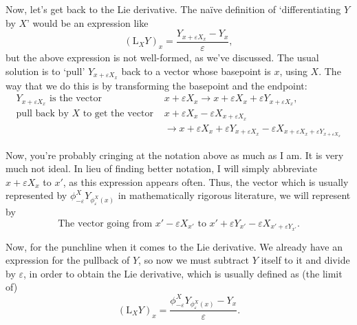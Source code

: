 \documentclass{article}
\theoremstyle{definition}
\newcommand{\Lie}{\mathrm{L}}
\begin{document}
Now, let's get back to the Lie derivative. The naïve definition of `differentiating $Y$ by $X$' would be an expression like
\begin{equation}
(\Lie_X Y)_x = \frac{Y_{x + \varepsilon X_x} - Y_x}\varepsilon,
\end{equation}
but the above expression is not well-formed, as we've discussed. The usual solution is to `pull' $Y_{x + \varepsilon X_x}$ back to a vector whose basepoint is $x$, using $X$. The way that we do this is by transforming the basepoint and the endpoint:
\begin{equation}
\begin{aligned}
Y_{x + \varepsilon X_x} \text{ is the vector }& x + \varepsilon X_x \rightarrow x + \varepsilon X_x + \varepsilon Y_{x + \varepsilon X_x},\\
\text{pull back by $X$ to get the vector }& x + \varepsilon X_x - \varepsilon X_{x+\varepsilon X_x}\\
& \rightarrow x + \varepsilon X_x + \varepsilon Y_{x + \varepsilon X_x} - \varepsilon X_{x + \varepsilon X_x + \varepsilon Y_{x + \varepsilon X_x}}
\end{aligned}
\end{equation}

Now, you're probably cringing at the notation above as much as I am. It is very much not ideal. In lieu of finding better notation, I will simply abbreviate $x + \varepsilon X_x$ to $x'$, as this expression appears often. Thus, the vector which is usually represented by $\phi^X_{-\varepsilon} Y_{\phi^X_{\varepsilon}(x)}$ in mathematically rigorous literature, we will represent by
\begin{equation}
\text{The vector going from } x' - \varepsilon X_{x'} \text{ to } x' + \varepsilon Y_{x'} - \varepsilon X_{x' + \varepsilon Y_{x'}}.
\end{equation}

Now, for the punchline when it comes to the Lie derivative. We already have an expression for the pullback of $Y$, so now we must subtract $Y$ itself to it and divide by $\varepsilon$, in order to obtain the Lie derivative, which is usually defined as (the limit of)
\begin{equation}
(\Lie_X Y)_x = \frac{\phi^X_{-\varepsilon} Y_{\phi^X_{\varepsilon}(x)} - Y_x}\varepsilon.
\end{equation}
\end{document}

